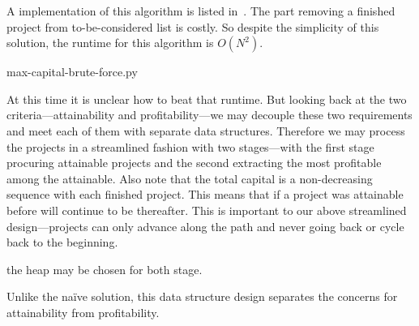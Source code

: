 A \python implementation of this algorithm is listed in~.
The part removing a finished project from to-be-considered list is costly.
So despite the simplicity of this solution, the runtime for this algorithm is $O(N^2)$.
\begin{clisting}
    
    {max-capital-brute-force.py}
\end{clisting}

At this time it is unclear how to beat that runtime.
But looking back at the two criteria---attainability and profitability---we may decouple these
two requirements and meet each of them with separate data structures.
Therefore we may process the projects in a streamlined fashion with two stages---with the first
stage procuring attainable projects and the second extracting the most
profitable among the attainable.
Also note that the total capital is a non-decreasing sequence with each finished project.
This means that if a project was attainable before will continue to be thereafter.
This is important to our above streamlined design---projects can only advance along the path and
never going back or cycle back to the beginning.

the heap may be chosen for both stage.

\begin{clisting}
    
\end{clisting}
Unlike the na\"{i}ve solution, this data structure design separates the concerns for attainability
from profitability.
